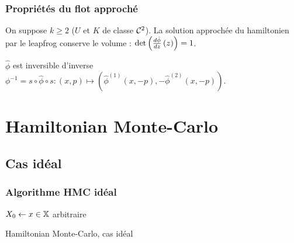 \documentclass[10pt]{beamer}
\begin{document}
\begin{frame}
	\frametitle{Propriétés du flot approché}
	\begin{Prop}
		On suppose $k \geq 2$ ($U$ et $K$ de classe $\mathcal{C}^2$). La solution approchée du hamiltonien par le leapfrog conserve le volume : $\det \left( \frac{d \hat \phi}{d z} \left( z \right) \right) = 1$.
	\end{Prop}
	\begin{Prop}
		$\hat \phi$ est inversible d'inverse $\phi^{-1} = s \circ \hat \phi \circ s : (x,p) \mapsto (\hat{\phi}^{(1)}(x,-p), -\hat{\phi}^{(2)}(x,-p))$.
	\end{Prop}
\end{frame}
 
\section{Hamiltonian Monte-Carlo}

\subsection{Cas idéal}
 
 
\begin{frame}
	\frametitle{Algorithme HMC idéal}
	\begin{center}
		\begin{algorithm}[H]
			$X_0 \leftarrow x \in \mathbb{X}$ arbitraire\;
			\caption{Hamiltonian Monte-Carlo, cas idéal}
			\label{algo:HMC-ideal}
		\end{algorithm}
	\end{center}
\end{frame}
\end{document}
